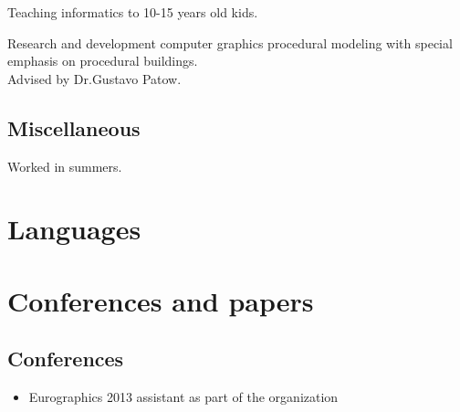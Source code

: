 
{
    Teaching informatics to 10-15 years old kids.
}


{
    Research and development computer graphics procedural modeling with special emphasis on procedural
    buildings. \\
    Advised by Dr.Gustavo Patow.
}


\subsection{Miscellaneous}

{
    Worked in summers.
}


\section{Languages}

\section{Conferences and papers}
    \subsection{Conferences}
            \begin{indentpar}{72pt}
                \begin{itemize}
                    \item Eurographics 2013 assistant as part of the organization
                \end{itemize}           
            \end{indentpar}

